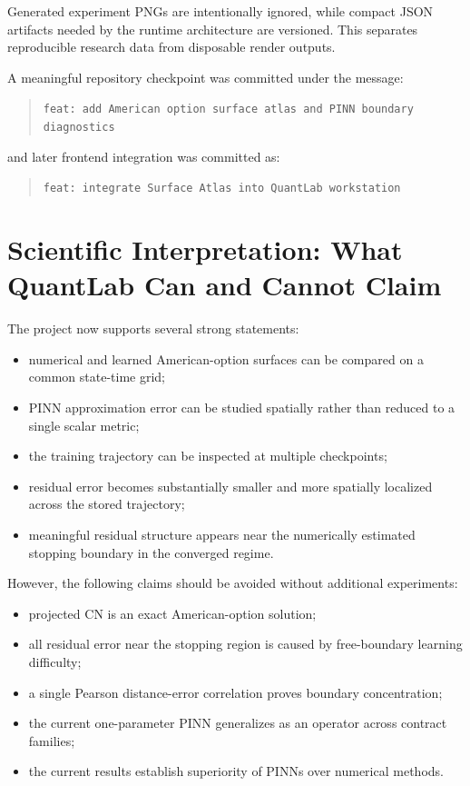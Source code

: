 \documentclass[11pt,a4paper]{article}
\begin{document}
Generated experiment PNGs are intentionally ignored, while compact JSON artifacts needed by the runtime architecture are versioned. This separates reproducible research data from disposable render outputs.

A meaningful repository checkpoint was committed under the message:

\begin{quote}
\texttt{feat: add American option surface atlas and PINN boundary diagnostics}
\end{quote}

and later frontend integration was committed as:

\begin{quote}
\texttt{feat: integrate Surface Atlas into QuantLab workstation}
\end{quote}

\section{Scientific Interpretation: What QuantLab Can and Cannot Claim}

The project now supports several strong statements:

\begin{itemize}[leftmargin=2em]
\item numerical and learned American-option surfaces can be compared on a common state-time grid;
\item PINN approximation error can be studied spatially rather than reduced to a single scalar metric;
\item the training trajectory can be inspected at multiple checkpoints;
\item residual error becomes substantially smaller and more spatially localized across the stored trajectory;
\item meaningful residual structure appears near the numerically estimated stopping boundary in the converged regime.
\end{itemize}

However, the following claims should be avoided without additional experiments:

\begin{itemize}[leftmargin=2em]
\item projected CN is an exact American-option solution;
\item all residual error near the stopping region is caused by free-boundary learning difficulty;
\item a single Pearson distance-error correlation proves boundary concentration;
\item the current one-parameter PINN generalizes as an operator across contract families;
\item the current results establish superiority of PINNs over numerical methods.
\end{itemize}
\end{document}

